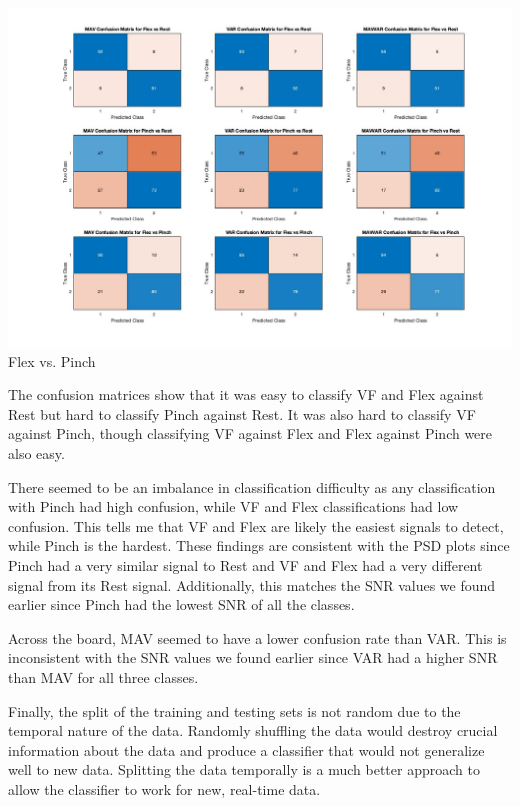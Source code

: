 \documentclass[12pt]{article}
\begin{document}
\begin{center}
    \includegraphics[width=\textwidth]{flex_pinch.jpg}
    Flex vs. Pinch
\end{center}

The confusion matrices show that it was easy to classify VF and Flex against Rest but hard to classify Pinch against Rest. It was also hard to classify VF against Pinch, though classifying VF against Flex and Flex against Pinch were also easy. 

There seemed to be an imbalance in classification difficulty as any classification with Pinch had high confusion, while VF and Flex classifications had low confusion. This tells me that VF and Flex are likely the easiest signals to detect, while Pinch is the hardest. These findings are consistent with the PSD plots since Pinch had a very similar signal to Rest and VF and Flex had a very different signal from its Rest signal. Additionally, this matches the SNR values we found earlier since Pinch had the lowest SNR of all the classes.

Across the board, MAV seemed to have a lower confusion rate than VAR. This is inconsistent with the SNR values we found earlier since VAR had a higher SNR than MAV for all three classes.

Finally, the split of the training and testing sets is not random due to the temporal nature of the data. Randomly shuffling the data would destroy crucial information about the data and produce a classifier that would not generalize well to new data. Splitting the data temporally is a much better approach to allow the classifier to work for new, real-time data.
\end{document}

